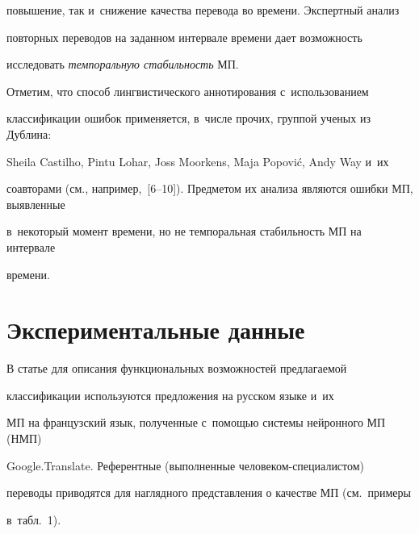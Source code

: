 повышение, так и~снижение качества перевода во времени. Экспертный анализ 


по\-втор\-ных переводов на заданном интервале времени дает воз\-мож\-ность 


исследовать \textit{темпоральную ста\-биль\-ность} МП.


  


  Отметим, что способ лингвистического аннотирования с~использованием 


классификации ошибок применяется, в~числе прочих, группой ученых из Дублина: 


Sheila Castilho, Pintu Lohar, Joss Moorkens, Maja Popovi\'{c}, Andy Way и~их 


соавторами (см., например,~[6--10]). Предметом их анализа являются ошибки МП, выявленные 


в~некоторый момент времени, но не темпоральная стабильность МП на интервале 


времени.


  


\section{Экспериментальные данные}





  В статье для описания функциональных возможностей предлагаемой 


классификации используются предложения на русском языке и~их 


МП на французский язык, полученные с~помощью системы нейронного МП (НМП)


Google.Translate. Референтные (выполненные че\-ло\-ве\-ком-спе\-ци\-а\-ли\-стом) 


переводы приводятся для наглядного представления о качестве МП (см.\ примеры 


в~табл.~1).


  


